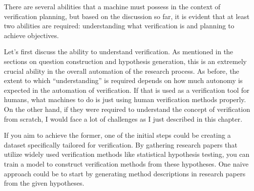 \documentclass{article}
\begin{document}


There are several abilities that a machine must possess in the context of verification planning, but based on the discussion so far, it is evident that at least two abilities are required: understanding what verification is and planning to achieve objectives.

Let's first discuss the ability to understand verification. As mentioned in the sections on question construction and hypothesis generation, this is an extremely crucial ability in the overall automation of the research process. As before, the extent to which ``understanding'' is required depends on how much autonomy is expected in the automation of verification. If that is used as a verification tool for humans, what machines to do is just using human verification methods properly. On the other hand, if they were required to understand the concept of verification from scratch, I would face a lot of challenges as I just described in this chapter. 

If you aim to achieve the former, one of the initial steps could be creating a dataset specifically tailored for verification. By gathering research papers that utilize widely used verification methods like statistical hypothesis testing, you can train a model to construct verification methods from these hypotheses. One naive approach could be to start by generating method descriptions in research papers from the given hypotheses. 
\end{document}
